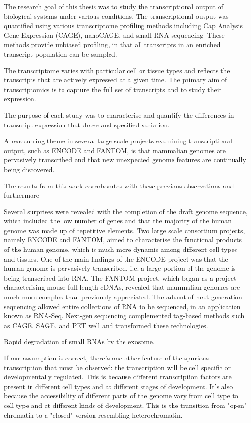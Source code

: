 The research goal of this thesis was to study the transcriptional output of biological systems under various conditions. The transcriptional output was quantified using various transcriptome profiling methods including Cap Analysis Gene Expression (CAGE), nanoCAGE, and small RNA sequencing. These methods provide unbiased profiling, in that all transcripts in an enriched transcript population can be sampled.

The transcriptome varies with particular cell or tissue types and reflects the transcripts that are actively expressed at a given time. The primary aim of transcriptomics is to capture the full set of transcripts and to study their expression.

The purpose of each study was to characterise and quantify the differences in transcript expression that drove and specified variation.

A reoccurring theme in several large scale projects examining transcriptional output, such as ENCODE and FANTOM, is that mammalian genomes are pervasively transcribed and that new unexpected genome features are continually being discovered. 

The results from this work corroborates with these previous observations and furthermore 

Several surprises were revealed with the completion of the draft genome sequence, which included the low number of genes and that the majority of the human genome was made up of repetitive elements. Two large scale consortium projects, namely ENCODE and FANTOM,  aimed to characterise the functional products of the human genome, which is much more dynamic among different cell types and tissues. One of the main findings of the ENCODE project was that the human genome is pervasively transcribed, i.e. a large portion of the genome is being transcribed into RNA. The FANTOM project, which began as a project characterising mouse full-length cDNAs, revealed that mammalian genomes are much more complex than previously appreciated. The advent of next-generation sequencing allowed entire collections of RNA to be sequenced, in an application known as RNA-Seq. Next-gen sequencing complemented tag-based methods such as CAGE, SAGE, and PET well and transformed these technologies.

Rapid degradation of small RNAs by the exosome.

If our assumption is correct, there's one other feature of the spurious transcription that must be observed: the transcription will be cell specific or developmentally regulated. This is because different transcription factors are present in different cell types and at different stages of development. It's also because the accessibility of different parts of the genome vary from cell type to cell type and at different kinds of development. This is the transition from "open" chromatin to a "closed" version resembling heterochromatin.

